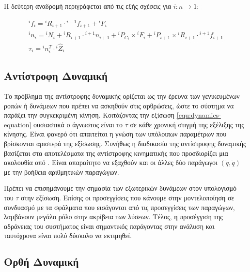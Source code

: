 Η δεύτερη αναδρομή περιγράφεται από τις εξής σχέσεις για $i : n \rightarrow 1$:

\begin{equation}
    \begin{aligned}
        ^if_i = {}^{i}R_{i+1} \cdot {}^{i+1}f_{i+1} + {}^iF_i\\[10pt]
        ^in_i = {}^iN_i + {}^iR_{i+1} \cdot {}^{i+1}n_{i+1} + {}^iP_{C_i} \times
        {}^iF_i + {}^iP_{i+1} \times {}^iR_{i+1} \cdot {}^{i+1}f_{i+1}\\[10pt]
        \tau_i = {}^in^T_i \cdot {}^i\hat{Z}_i
    \end{aligned}
    \label{equ:iterative-NE-second}
\end{equation}

\subsection{Αντίστροφη Δυναμική}

Το πρόβλημα της αντίστροφης δυναμικής ορίζεται ως την έρευνα των γενικευμένων ροπών ή δυνάμεων που πρέπει να ασκηθούν στις αρθρώσεις, ώστε το σύστημα να παράξει την συγκεκριμένη κίνηση. Κοιτάζοντας την εξίσωση \ref{equ:dynamics-equation} ουσιαστικά ο άγνωστος είναι το $\tau $ σε κάθε χρονική στιγμή της εξέλιξης της κίνησης. Είναι φανερό ότι απαιτείται η γνώση των υπόλοιπων παραμέτρων που βρίσκονται αριστερά της εξίσωσης. Συνήθως η διαδικασία της αντίστροφης δυναμικής βασίζεται στα αποτελέσματα της αντίστροφης κινηματικής που προσδιορίζει μια ακολουθία από . Είναι απαραίτητο να εξαχθούν και οι άλλες δύο παράγωγοι $(\dot{q}, \ddot{q})$ με την βοήθεια αριθμητικών παραγώγων.

Πρέπει να επισημάνουμε την σημασία των εξωτερικών δυνάμεων στον υπολογισμό του $\tau $ στην εξίσωση. Επίσης οι προσεγγίσεις που κάνουμε στην μοντελοποίηση σε συνδυασμό με τα σφάλματα που εισάγονται από τις προσεγγίσεις των παραγώγων, λαμβάνουν μεγάλο ρόλο στην ακρίβεια των λύσεων. Τέλος, η προσέγγιση της αδράνειας του συστήματος είναι σημαντικός παράγοντας στην ανάλυση και ταυτόχρονα είναι πολύ δύσκολο να εκτιμηθεί.

\subsection{Ορθή Δυναμική}


